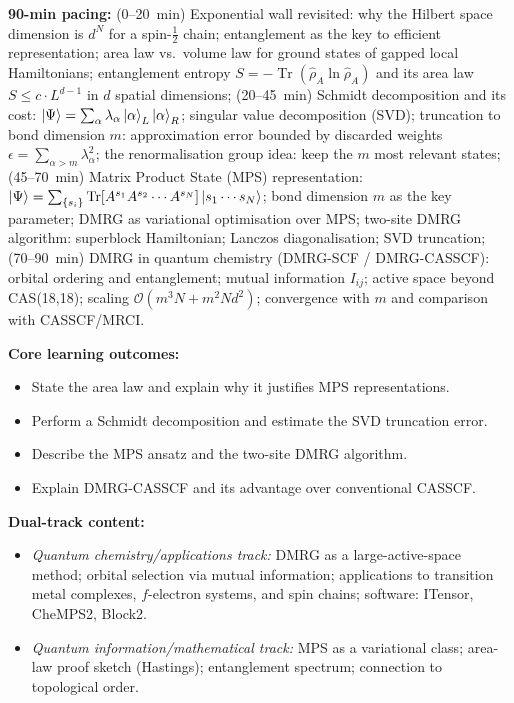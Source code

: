 \documentclass[11pt,a4paper]{article}
\begin{document}
\begin{tcolorbox}[modulebox, title={Module~II.1 --- Lecture L07: Density Matrix Renormalisation Group}]
\textbf{90-min pacing:} (0--20~min) Exponential wall revisited: why the Hilbert space
dimension is $d^N$ for a spin-$\tfrac{1}{2}$ chain; entanglement as the key to efficient
representation; area law vs.\ volume law for ground states of gapped local Hamiltonians;
entanglement entropy $S = -\operatorname{Tr}(\hat{\rho}_A \ln\hat{\rho}_A)$
and its area law $S \leq c \cdot L^{d-1}$ in $d$ spatial dimensions;
(20--45~min) Schmidt decomposition and its cost: $\ket{\Psi}=\sum_\alpha \lambda_\alpha
\ket{\alpha}_L\ket{\alpha}_R$; singular value decomposition (SVD);
truncation to bond dimension $m$: approximation error bounded by discarded weights
$\epsilon = \sum_{\alpha>m}\lambda_\alpha^2$;
the renormalisation group idea: keep the $m$ most relevant states;
(45--70~min) Matrix Product State (MPS) representation:
$\ket{\Psi}=\sum_{\{s_i\}}\text{Tr}[A^{s_1}A^{s_2}\cdots A^{s_N}]\ket{s_1\cdots s_N}$;
bond dimension $m$ as the key parameter; DMRG as variational optimisation over MPS;
two-site DMRG algorithm: superblock Hamiltonian; Lanczos diagonalisation; SVD truncation;
(70--90~min) DMRG in quantum chemistry (DMRG-SCF / DMRG-CASSCF):
orbital ordering and entanglement; mutual information $I_{ij}$;
active space beyond CAS(18,18); scaling $\mathcal{O}(m^3 N + m^2 N d^2)$;
convergence with $m$ and comparison with CASSCF/MRCI.

\medskip\textbf{Core learning outcomes:}
\begin{itemize}[leftmargin=1.4em,topsep=2pt,itemsep=1pt]
  \item State the area law and explain why it justifies MPS representations.
  \item Perform a Schmidt decomposition and estimate the SVD truncation error.
  \item Describe the MPS ansatz and the two-site DMRG algorithm.
  \item Explain DMRG-CASSCF and its advantage over conventional CASSCF.
\end{itemize}

\medskip\textbf{Dual-track content:}
\begin{itemize}[leftmargin=1.4em,topsep=2pt,itemsep=1pt]
  \item \textit{Quantum chemistry/applications track:} DMRG as a large-active-space method;
    orbital selection via mutual information; applications to transition metal complexes,
    $f$-electron systems, and spin chains; software: ITensor, CheMPS2, Block2.
  \item \textit{Quantum information/mathematical track:} MPS as a variational class;
    area-law proof sketch (Hastings); entanglement spectrum; connection to topological order.
\end{itemize}


\end{tcolorbox}
\end{document}
